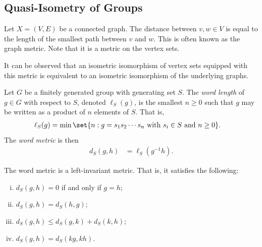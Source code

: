 \documentclass[10pt]{mypackage}
\begin{document}
\subsection{Quasi-Isometry of Groups}%
\begin{definition}
  Let $X = \left( V,E \right)$ be a connected graph. The distance between $v,w\in V$ is equal to the length of the smallest path between $v$ and $w$. This is often known as the graph metric. Note that it is a metric on the vertex sets.
\end{definition}
It can be observed that an isometric isomorphism of vertex sets equipped with this metric is equivalent to an isometric isomorphism of the underlying graphs.
\begin{definition}
  Let $G$ be a finitely generated group with generating set $S$. The \textit{word length} of $g\in G$ with respect to $S$, denoted $\ell_S(g)$, is the smallest $n\geq 0$ such that $g$ may be written as a product of $n$ elements of $S$. That is,
  \begin{align*}
    \ell_S(g) &= \min\set{n : g = s_1s_2\cdots s_n\text{ with }s_i\in S\text{ and }n\geq 0}.
  \end{align*}
  The \textit{word metric} is then
  \begin{align*}
    d_S(g,h) &= \ell_S\left( g^{-1}h \right).
  \end{align*}
\end{definition}
\begin{proposition}
  The word metric is a left-invariant metric. That is, it satisfies the following:
  \begin{enumerate}[(i)]
    \item $d_S\left( g,h \right) = 0$ if and only if $g = h$;
    \item $d_S\left( g,h \right) = d_S\left( h,g \right)$;
    \item $d_S\left( g,h \right) \leq d_S\left( g,k \right) + d_S\left( k,h \right)$;
    \item $d_S\left( g,h \right) = d_S\left( kg,kh \right)$.
  \end{enumerate}
\end{proposition}
\end{document}
